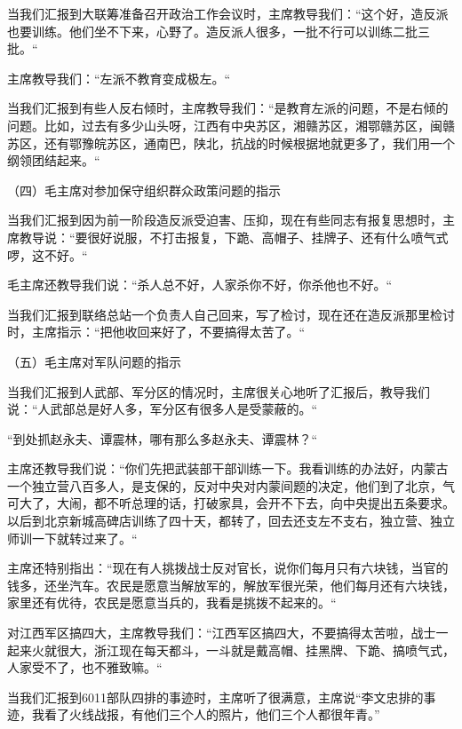 当我们汇报到大联筹准备召开政治工作会议时，主席教导我们：“这个好，造反派也要训练。他们坐不下来，心野了。造反派人很多，一批不行可以训练二批三批。“

主席教导我们：“左派不教育变成极左。“

当我们汇报到有些人反右倾时，主席教导我们：“是教育左派的问题，不是右倾的问题。比如，过去有多少山头呀，江西有中央苏区，湘赣苏区，湘鄂赣苏区，闽赣苏区，还有鄂豫皖苏区，通南巴，陕北，抗战的时候根据地就更多了，我们用一个纲领团结起来。“

（四）毛主席对参加保守组织群众政策问题的指示

当我们汇报到因为前一阶段造反派受迫害、压抑，现在有些同志有报复思想时，主席教导说：“要很好说服，不打击报复，下跪、高帽子、挂牌子、还有什么喷气式啰，这不好。“

毛主席还教导我们说：“杀人总不好，人家杀你不好，你杀他也不好。“

当我们汇报到联络总站一个负责人自己回来，写了检讨，现在还在造反派那里检讨时，主席指示：“把他收回来好了，不要搞得太苦了。“

（五）毛主席对军队问题的指示

当我们汇报到人武部、军分区的情况时，主席很关心地听了汇报后，教导我们说：“人武部总是好人多，军分区有很多人是受蒙蔽的。“

“到处抓赵永夫、谭震林，哪有那么多赵永夫、谭震林？“

主席还教导我们说：“你们先把武装部干部训练一下。我看训练的办法好，内蒙古一个独立营八百多人，是支保的，反对中央对内蒙间题的决定，他们到了北京，气可大了，大闹，都不听总理的话，打破家具，会开不下去，向中央提出五条要求。以后到北京新城高碑店训练了四十天，都转了，回去还支左不支右，独立营、独立师训一下就转过来了。“

主席还特别指出：“现在有人挑拨战士反对官长，说你们每月只有六块钱，当官的钱多，还坐汽车。农民是愿意当解放军的，解放军很光荣，他们每月还有六块钱，家里还有优待，农民是愿意当兵的，我看是挑拨不起来的。“

对江西军区搞四大，主席教导我们：“江西军区搞四大，不要搞得太苦啦，战士一起来火就很大，浙江现在每天都斗，一斗就是戴高帽、挂黑牌、下跪、搞喷气式，人家受不了，也不雅致嘛。“

   当我们汇报到6011部队四排的事迹时，主席听了很满意，主席说“李文忠排的事迹，我看了火线战报，有他们三个人的照片，他们三个人都很年青。”


